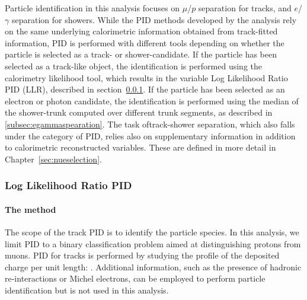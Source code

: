 Particle identification in this analysis focuses on $\mu$/$p$ separation for tracks, and $e$/$\gamma$ separation for showers. While the PID methods developed by the analysis rely on the same underlying calorimetric information obtained from track-fitted \dedx information, PID is performed with different tools depending on whether the particle is selected as a track- or shower-candidate.
If the particle has been selected as a track-like object, the identification is performed using the calorimetry likelihood tool, which results in the variable Log Likelihood Ratio PID (LLR), described in section~\ref{subsec:loglikelihoodpid}.
If the particle has been selected as an electron or photon candidate, the identification is performed using the median \dedx of the shower-trunk computed over different trunk segments, as described in \ref{subsec:egammaspearation}.
The task oftrack-shower separation, which also falls under the category of PID, relies also on supplementary information in addition to calorimetric \dedx reconstructed variables. These are defined in more detail in Chapter~\ref{sec:nueselection}.

\subsubsection{Log Likelihood Ratio PID}
\label{subsec:loglikelihoodpid}

\paragraph{The method}
The scope of the track PID is to identify the particle species. In this analysis, we limit PID to a binary classification problem aimed at distinguishing protons from muons. PID for tracks is performed by studying the profile of the deposited charge per unit length: \dedx.  %
Additional information, such as the presence of hadronic re-interactions or Michel electrons, can be employed to perform particle identification but is not used in this analysis.

